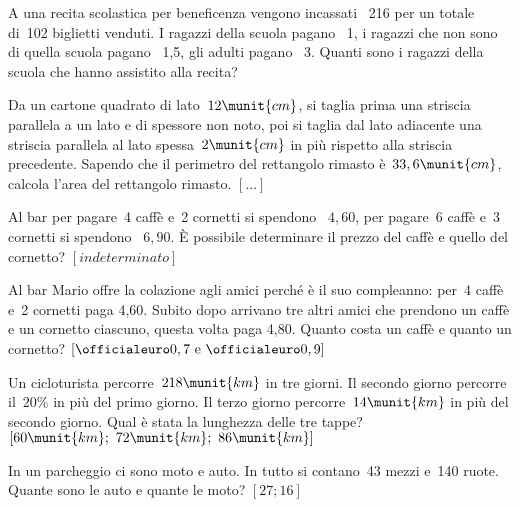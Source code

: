 \begin{htmulticols}{2}
\begin{esercizio}
 \label{ese:22.91}
A una recita scolastica per beneficenza vengono incassati
{\officialeuro}~216 per un totale di~102 biglietti venduti. 
I ragazzi della scuola pagano {\officialeuro}~1, i ragazzi che non sono 
di quella scuola pagano {\officialeuro}~1,5, gli adulti pagano 
{\officialeuro}~3. 
Quanti sono i ragazzi della scuola che hanno assistito alla recita?
\end{esercizio}


\begin{esercizio}
 \label{ese:22.92}
Da un cartone quadrato di lato~\(12\munit{cm}\), si taglia prima una 
striscia parallela a un lato e di spessore non noto, poi si taglia dal 
lato adiacente una striscia parallela al lato spessa~\(2\munit{cm}\) in 
più rispetto alla striscia precedente. 
Sapendo che il perimetro del rettangolo rimasto è~\(33,6\munit{cm}\), 
calcola l'area del rettangolo rimasto.
\hfill \(\left[...\right]\)
\end{esercizio}

\begin{esercizio}[*]
 \label{ese:22.93}
Al bar per pagare~4 caffè e~2 cornetti si spendono 
{\officialeuro}~\(4,60\), per pagare~6 caffè
e~3 cornetti si spendono {\officialeuro}~\(6,90\). 
È possibile determinare il prezzo del caffè e quello del cornetto?
\hfill \(\left[indeterminato\right]\)
\end{esercizio}

\begin{esercizio}[*]
 \label{ese:22.94}
 Al bar Mario offre la colazione agli amici perché è il suo
compleanno: per~4 caffè e~2 cornetti paga {\officialeuro}4,60. 
Subito dopo arrivano tre altri amici che prendono un caffè e un cornetto
ciascuno, questa volta paga {\officialeuro}4,80. 
Quanto costa un caffè e quanto un cornetto?
\hfill \(\left[\officialeuro 0,7 \text{ e } \officialeuro 0,9\right]\)
\end{esercizio}

\begin{esercizio}[*]
 \label{ese:22.95}
Un cicloturista percorre~\(218\munit{km}\) in tre giorni. 
Il secondo giorno percorre il~\(20\%\) in più del primo giorno. 
Il terzo giorno percorre~\(14\munit{km}\) in più del secondo giorno. 
Qual è stata la lunghezza delle tre tappe?
\hfill \(\left[60\munit{km};~72\munit{km};~86\munit{km}\right]\)
\end{esercizio}

\begin{esercizio}[*]
 \label{ese:22.96}
In un parcheggio ci sono moto e auto. In tutto si contano~43 mezzi e~140
ruote. Quante sono le auto e quante le moto?
\hfill \(\left[27; 16\right]\)
\end{esercizio}


\end{htmulticols}
